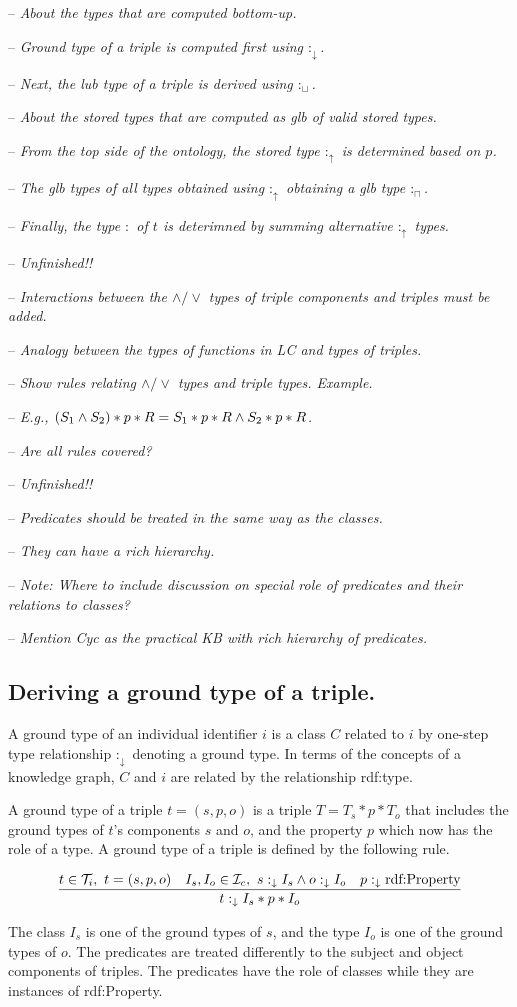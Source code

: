 \documentclass[runningheads]{llncs}
\newcommand{\darr}{\downarrow}
\newcommand{\uarr}{\uparrow}
\newcommand{\Ic}{{\cal I}_c}
\newcommand{\Ti}{{\cal T}_i}
\newcommand{\notes}[1]{\noindent\begin{small}-- \emph{#1}\\\end{small}}
\begin{document}
\notes{About the types that are computed bottom-up.}
\notes{Ground type of a triple is computed first using $:_\darr$.}
\notes{Next, the lub type of a triple is derived using $:_\sqcup$.}

\notes{About the stored types that are computed as glb of valid stored types.}
\notes{From the top side of the ontology, the stored type $:_\uarr$ is determined based on $p$.}
\notes{The glb types of all types obtained using $:_\uarr$ obtaining a glb type $:_\sqcap$.}
\notes{Finally, the type $:$ of $t$ is deterimned by summing alternative $:_\uarr$ types.}

\notes{Unfinished!!}
\notes{Interactions between the $\land/\lor$ types of triple components and triples must be added.}
\notes{Analogy between the types of functions in LC and types of triples.}
\notes{Show rules relating $\land/\lor$ types and triple types. Example.}
\notes{E.g., $(S_1\land\/S_2)*p*R = S_1*p*R\land\/S_2*p*R$.}
\notes{Are all rules covered?}

\notes{Unfinished!!}
\notes{Predicates should be treated in the same way as the classes.}
\notes{They can have a rich hierarchy.}
\notes{\emph{Note:} Where to include discussion on special role of predicates and their relations to classes?}
\notes{Mention Cyc as the practical KB with rich hierarchy of predicates.}




\subsection{Deriving a ground type of a triple.}

\noindent
A ground type of an individual identifier $i$ is a class $C$ related
to $i$ by one-step type relationship $:_\darr$ denoting a ground
type. In terms of the concepts of a knowledge graph, $C$ and $i$ are
related by the relationship rdf:type.

A ground type of a triple $t=(s,p,o)$ is a triple $T=T_s*p*T_o$ that
includes the ground types of $t$'s components $s$ and $o$, and the
property $p$ which now has the role of a type. A ground type of a
triple is defined by the following rule.

\begin{equation}
\label{rul:3-ground}
\dfrac{t\in\/\Ti,\ t=(s,p,o)\quad I_s,I_o\in\Ic,\ s:_\darr\/I_s\land\/o:_\darr\/I_o\quad p:_\darr\text{rdf:Property}}
      {t:_\darr\/I_s*p*I_o}
\end{equation}

The class $I_s$ is one of the ground types of $s$, and the type $I_o$
is one of the ground types of $o$. The predicates are treated
differently to the subject and object components of triples. The
predicates have the role of classes while they are instances of
rdf:Property.
\end{document}
